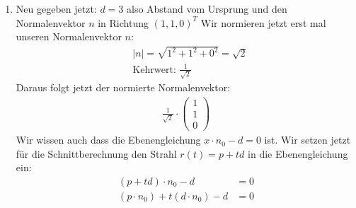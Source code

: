 \documentclass[11pt]{article}
\begin{document}
\begin{enumerate}
\begin{align*}
\begin{pmatrix*}
    0
  \end{pmatrix*} = \begin{pmatrix*}
    3\\
    3\\
    1
  \end{pmatrix*} \\\\
  r(8) &= \begin{pmatrix*}
    -1\\
    -1\\
    1
  \end{pmatrix*} + 8 \cdot \begin{pmatrix*}
    1\\
    1\\
    0
  \end{pmatrix*} = \begin{pmatrix*}
    7\\
    7\\
    1
  \end{pmatrix*} \\
\end{align*} 
Das sind jetzt die beiden Schnittpunkte. Hier sieht man jetzt relativ schnell, welches der Schnittpunkt für den Betrachter sichtbar ist. Nämlich der Schnittpunkt mit dem kleinsten \textbf{positiven} Parameterwert. Hier ist es einmal $t_1 = 8$ und $t_2 = 4$. Somit ist der sichtbare Schnittpunkt $r(4) = (3,~3,~1)^T$.
\item Neu gegeben jetzt: $d = 3$ also Abstand vom Ursprung und den Normalenvektor $n$ in Richtung $(1, 1, 0)^T$
Wir normieren jetzt erst mal unseren Normalenvektor $n$: 
\begin{align*}
  &|n| = \sqrt{1^2 + 1^2 + 0^2} = \sqrt{2} \\
  &\text{Kehrwert: } \frac{1}{\sqrt{2}} 
\end{align*}
Daraus folgt jetzt der normierte Normalenvektor:
\begin{align*} \frac{1}{\sqrt{2}} \cdot 
  \begin{pmatrix*}
    1 \\
    1\\
    0
  \end{pmatrix*}
\end{align*}
Wir wissen auch dass die Ebenengleichung $x \cdot n_0 - d = 0$ ist. Wir setzen jetzt für die Schnittberechnung den Strahl $r(t) = p + td$ in die Ebenengleichung ein:
\begin{align*}
  (p + td) \cdot n_0 - d &= 0 \\
  (p \cdot n_0) + t(d \cdot n_0) - d &= 0 \\

\end{align*}
\end{enumerate}
\end{document}
